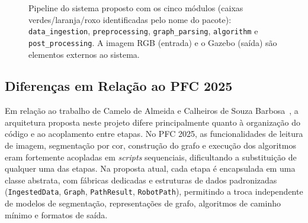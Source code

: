 \documentclass[
    12pt,
    openright,
    oneside,
    a4paper,
    english,
    brazil
]{abntex2}
\begin{document}
\begin{figure}[H]
{}
    \caption{Pipeline do sistema proposto com os cinco módulos (caixas verdes/laranja/roxo identificadas pelo nome do pacote): \texttt{data\_ingestion}, \texttt{preprocessing}, \texttt{graph\_parsing}, \texttt{algorithm} e \texttt{post\_processing}. A imagem RGB (entrada) e o Gazebo (saída) são elementos externos ao sistema.}
    \label{fig:pipeline}
\end{figure}

\subsection{Diferenças em Relação ao PFC 2025}
\label{subsec:diferencas_pfc2025}

Em relação ao trabalho de Camelo de Almeida e Calheiros de Souza Barbosa~\cite{camelo2025}, a arquitetura proposta neste projeto difere principalmente quanto à organização do código e ao acoplamento entre etapas. No PFC 2025, as funcionalidades de leitura de imagem, segmentação por cor, construção do grafo e execução dos algoritmos eram fortemente acopladas em \textit{scripts} sequenciais, dificultando a substituição de qualquer uma das etapas. Na proposta atual, cada etapa é encapsulada em uma classe abstrata, com fábricas dedicadas e estruturas de dados padronizadas (\texttt{IngestedData}, \texttt{Graph}, \texttt{PathResult}, \texttt{RobotPath}), permitindo a troca independente de modelos de segmentação, representações de grafo, algoritmos de caminho mínimo e formatos de saída.
\end{document}
